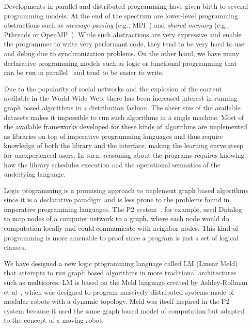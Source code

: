 
Developments in parallel and distributed programming have given birth to several programming models.
At the end of the spectrum are lower-level programming abstractions such as
\emph{message passing} (e.g., MPI~\cite{gabriel04-open-mpi}) and \emph{shared memory}
(e.g., Pthreads or OpenMP~\cite{Chapman-2007-UOP-1370966}).
While such abstractions are very expressive and enable the programmer to write very performant code,
they tend to be very hard to use and debug due to synchronization problems.
On the other hand, we have many declarative programming models such as logic or functional programming
that can be run in parallel~\cite{Blelloch:1996:PPA:227234.227246} and tend to be easier to write.

Due to the popularity of social networks and the explosion of the content available in the World Wide Web, there has been
increased interest in running graph based algorithms in a distribution fashion. The sheer size of
the available datasets makes it impossible to run such algorithms in a single machine.
Most of the available frameworks developed for these kinds of algorithms are implemented as libraries on top
of imperative programming languages and thus require knowledge of both the library and the interface, making
the learning curve steep for unexperienced users. In turn, reasoning about the programs requires knowing how
the library schedules execution and the operational semantics of the underlying language.

Logic programming is a promising approach to implement graph based algorithms since it is a declarative paradigm
and is less prone to the problems found in imperative programming languages.
The P2 system~\cite{Loo-condie-garofalakis-p2}, for example, used Datalog to map nodes of a computer network
to a graph, where each node would do computation locally and could communicate with neighbor nodes.
This kind of programming is more amenable to proof since a program is just a set of logical clauses.

We have designed a new logic programming language called LM (Linear Meld) that attempts to run graph based
algorithms in more traditional architectures such as multicores. LM is based on the Meld language created by
Ashley-Rollman et al~\cite{ashley-rollman-iclp09,ashley-rollman-derosa-iros07wksp}, which was designed to
program massively distributed systems made of modular robots with a dynamic topology. Meld was itself inspired
in the P2 system because it used the same graph based model of computation but adapted to the concept of a moving
robot.

